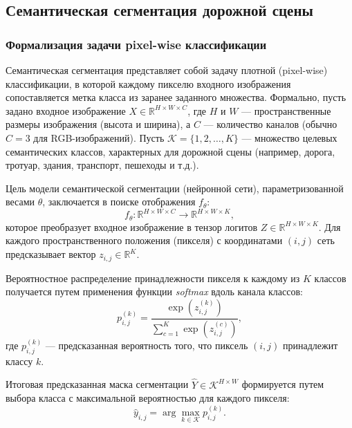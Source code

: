 \documentclass[14pt,a4paper]{extarticle}
\begin{document}
\subsection{Семантическая сегментация дорожной сцены}

\subsubsection{Формализация задачи pixel-wise классификации}
Семантическая сегментация представляет собой задачу плотной (pixel-wise) классификации, в которой каждому пикселю входного изображения сопоставляется метка класса из заранее заданного множества. Формально, пусть задано входное изображение $X \in \mathbb{R}^{H \times W \times C}$, где $H$ и $W$ --- пространственные размеры изображения (высота и ширина), а $C$ --- количество каналов (обычно $C=3$ для RGB-изображений). Пусть $\mathcal{K} = \{1, 2, \dots, K\}$ --- множество целевых семантических классов, характерных для дорожной сцены (например, дорога, тротуар, здания, транспорт, пешеходы и т.д.).

Цель модели семантической сегментации (нейронной сети), параметризованной весами $\theta$, заключается в поиске отображения $f_\theta$:
\begin{equation}
    f_\theta : \mathbb{R}^{H \times W \times C} \to \mathbb{R}^{H \times W \times K},
\end{equation}
которое преобразует входное изображение в тензор логитов $Z \in \mathbb{R}^{H \times W \times K}$. Для каждого пространственного положения (пикселя) с координатами $(i, j)$ сеть предсказывает вектор $z_{i,j} \in \mathbb{R}^K$.

Вероятностное распределение принадлежности пикселя к каждому из $K$ классов получается путем применения функции \textit{softmax} вдоль канала классов:
\begin{equation}
    p_{i,j}^{(k)} = \frac{\exp\left(z_{i,j}^{(k)}\right)}{\sum_{c=1}^K \exp\left(z_{i,j}^{(c)}\right)},
\end{equation}
где $p_{i,j}^{(k)}$ --- предсказанная вероятность того, что пиксель $(i, j)$ принадлежит классу $k$.

Итоговая предсказанная маска сегментации $\hat{Y} \in \mathcal{K}^{H \times W}$ формируется путем выбора класса с максимальной вероятностью для каждого пикселя:
\begin{equation}
    \hat{y}_{i,j} = \arg\max_{k \in \mathcal{K}} p_{i,j}^{(k)}.
\end{equation}
\end{document}
